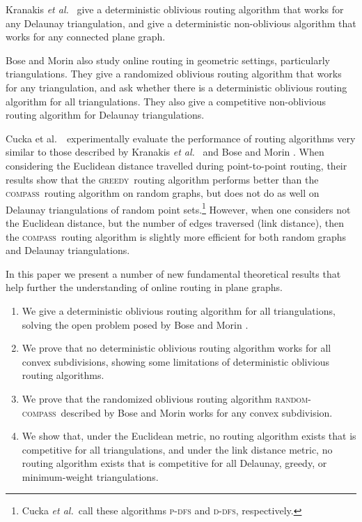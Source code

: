 \documentclass{article}
\newcommand{\etal}{\emph{et al.}}
\newcommand{\rc}{\textsc{random-compass}}
\newcommand{\compass}{\textsc{compass}}
\newcommand{\greedy}{\textsc{greedy}}
\begin{document}
Kranakis \etal\ \cite{ksu99} give a deterministic oblivious routing
algorithm that works for any Delaunay triangulation, and give a
deterministic non-oblivious algorithm that works for any connected
plane graph.

Bose and Morin \cite{bm99a} also study online routing in geometric
settings, particularly triangulations.  They give a randomized
oblivious routing algorithm that works for any triangulation, and ask
whether there is a deterministic oblivious routing algorithm for all
triangulations.  They also give a competitive non-oblivious routing
algorithm for Delaunay triangulations.

Cucka et al.~\cite{CuNeRo96}\ experimentally evaluate the performance
of routing algorithms very similar to those described by Kranakis
\etal\ \cite{ksu99} and Bose and Morin \cite{bm99a}.  When considering
the Euclidean distance travelled during point-to-point routing, their
results show that the \greedy\ routing algorithm \cite{bm99a} performs
better than the \compass\ routing algorithm \cite{bm99a,ksu99} on
random graphs, but does not do as well on Delaunay triangulations of
random point sets.\footnote{Cucka \etal\ call these algorithms
\textsc{p-dfs} and \textsc{d-dfs}, respectively.}  However, when one
considers not the Euclidean distance, but the number of edges
traversed (link distance), then the \compass\ routing algorithm is
slightly more efficient for both random graphs and Delaunay
triangulations.

In this paper we present a number of new fundamental theoretical
results that help further the understanding of online routing in plane
graphs.

\begin{enumerate}
\item We give a deterministic oblivious routing algorithm for all
triangulations, solving the open problem posed by Bose and Morin
\cite{bm99a}.

\item We prove that no deterministic oblivious routing algorithm
works for all convex subdivisions, showing some limitations of
deterministic oblivious routing algorithms.

\item We prove that the randomized oblivious routing algorithm \rc\
described by Bose and Morin \cite{bm99a} works for any convex
subdivision.

\item We show that, under the Euclidean metric, no routing algorithm
exists that is competitive for all triangulations, and under the link
distance metric, no routing algorithm exists that is competitive for
all Delaunay, greedy, or minimum-weight triangulations.
\end{enumerate}
\end{document}
